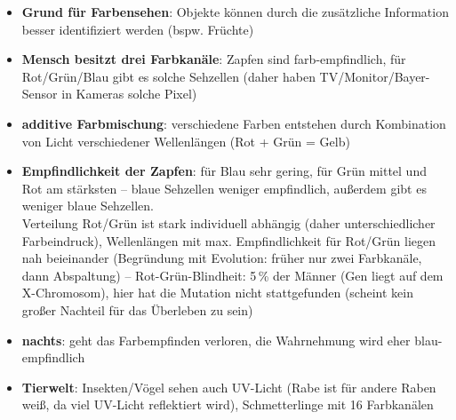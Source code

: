 \begin{itemize}
    \item
    \textbf{Grund für Farbensehen}:
    Objekte können durch die zusätzliche Information besser identifiziert
    werden (bspw. Früchte)

    \item
    \textbf{Mensch besitzt drei Farbkanäle}:
    Zapfen sind farb-empfindlich, für Rot/Grün/Blau gibt es solche Sehzellen
    (daher haben TV/Monitor/Bayer-Sensor in Kameras solche Pixel)

    \item
    \textbf{additive Farbmischung}:
    verschiedene Farben entstehen durch Kombination von Licht verschiedener
    Wellenlängen (Rot + Grün = Gelb)

    \item
    \textbf{Empfindlichkeit der Zapfen}:
    für Blau sehr gering, für Grün mittel und Rot am stärksten --
    blaue Sehzellen weniger empfindlich, außerdem gibt es weniger blaue
    Sehzellen. \\
    Verteilung Rot/Grün ist stark individuell abhängig
    (daher unterschiedlicher Farbeindruck),
    Wellenlängen mit max. Empfindlichkeit für Rot/Grün liegen nah beieinander
    (Begründung mit Evolution: früher nur zwei Farbkanäle, dann Abspaltung) --
    Rot-Grün-Blindheit: 5\,\% der Männer (Gen liegt auf dem X-Chromosom),
    hier hat die Mutation nicht stattgefunden
    (scheint kein großer Nachteil für das Überleben zu sein)

    \item
    \textbf{nachts}:
    geht das Farbempfinden verloren, die Wahrnehmung wird eher blau-empfindlich

    \item
    \textbf{Tierwelt}:
    Insekten/Vögel sehen auch UV-Licht
    (Rabe ist für andere Raben weiß, da viel UV-Licht reflektiert wird),
    Schmetterlinge mit 16 Farbkanälen
\end{itemize}
\linie
\pagebreak
